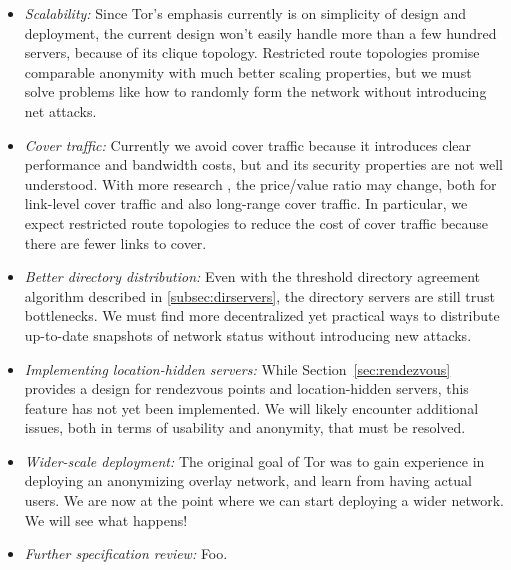 \documentclass[times,10pt,twocolumn]{article}
\begin{document}
\begin{itemize}
\item \emph{Scalability:} Since Tor's emphasis currently is on simplicity
of design and deployment, the current design won't easily handle more
than a few hundred servers, because of its clique topology. Restricted
route topologies \cite{danezis-pets03} promise comparable anonymity
with much better scaling properties, but we must solve problems like
how to randomly form the network without introducing net attacks.
\item \emph{Cover traffic:} Currently we avoid cover traffic because
it introduces clear performance and bandwidth costs, but and its
security properties are not well understood. With more research
\cite{SS03,defensive-dropping}, the price/value ratio may change, both for
link-level cover traffic and also long-range cover traffic. In particular,
we expect restricted route topologies to reduce the cost of cover traffic
because there are fewer links to cover.
\item \emph{Better directory distribution:} Even with the threshold
directory agreement algorithm described in \ref{subsec:dirservers},
the directory servers are still trust bottlenecks. We must find more
decentralized yet practical ways to distribute up-to-date snapshots of
network status without introducing new attacks.
\item \emph{Implementing location-hidden servers:} While
Section~\ref{sec:rendezvous} provides a design for rendezvous points and
location-hidden servers, this feature has not yet been implemented.
We will likely encounter additional issues, both in terms of usability
and anonymity, that must be resolved.
\item \emph{Wider-scale deployment:} The original goal of Tor was to
gain experience in deploying an anonymizing overlay network, and learn
from having actual users. We are now at the point where we can start
deploying a wider network. We will see what happens!
\item \emph{Further specification review:} Foo.
\end{itemize}






\end{document}
